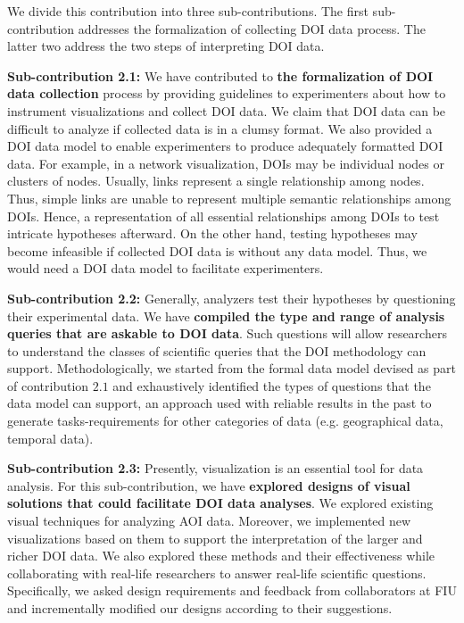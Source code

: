 We divide this contribution into three sub-contributions. The first sub-contribution addresses the formalization of collecting DOI data process. The latter two address the two steps of interpreting DOI data.  

\textbf{Sub-contribution 2.1:} We have contributed to \textbf{the formalization of DOI data collection} process by providing guidelines to experimenters about how to instrument visualizations and collect DOI data. We claim that DOI data can be difficult to analyze if collected data is in a clumsy format. We also provided a DOI data model to enable experimenters to produce adequately formatted DOI data. For example, in a network visualization, DOIs may be individual nodes or clusters of nodes. Usually,  links represent a single relationship among nodes. Thus, simple links are unable to represent multiple semantic relationships among DOIs. Hence, a representation of all essential relationships among DOIs to test intricate hypotheses afterward. On the other hand, testing hypotheses may become infeasible if collected DOI data is without any data model. Thus, we would need a DOI data model to facilitate experimenters. 

\textbf{Sub-contribution 2.2:} Generally, analyzers test their hypotheses by questioning their experimental data. We have \textbf{compiled the type and range of analysis queries that are askable to DOI data}. Such questions will allow researchers to understand the classes of scientific queries that the DOI methodology can support. Methodologically, we started from the formal data model devised as part of contribution $2.1$ and exhaustively identified the types of questions that the data model can support, an approach used with reliable results in the past to generate tasks-requirements for other categories of data (e.g. geographical data, temporal data). 

\textbf{Sub-contribution 2.3:} Presently, visualization is an essential tool for data analysis. For this sub-contribution, we have \textbf{explored designs of visual solutions that could facilitate DOI data analyses}. We explored existing visual techniques for analyzing AOI data. Moreover, we implemented new visualizations based on them to support the interpretation of the larger and richer DOI data. We also explored these methods and their effectiveness while collaborating with real-life researchers to answer real-life scientific questions. Specifically, we asked design requirements and feedback from collaborators at FIU and incrementally modified our designs according to their suggestions. 

